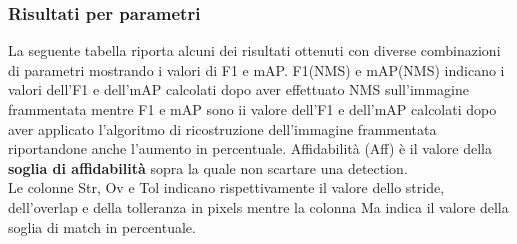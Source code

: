 \clearpage
\subsubsection{Risultati per parametri}
La seguente tabella riporta alcuni dei risultati ottenuti con diverse combinazioni di parametri mostrando i valori di F1 e mAP. F1(NMS) e mAP(NMS) indicano i valori dell'F1 e dell'mAP calcolati dopo aver effettuato NMS sull'immagine frammentata mentre F1 e mAP sono ii valore dell'F1 e dell'mAP calcolati dopo aver applicato l'algoritmo di ricostruzione dell'immagine frammentata riportandone anche l'aumento in percentuale. Affidabilità (Aff) è il valore della \textbf{soglia di affidabilità} sopra la quale non scartare una detection.\\
Le colonne Str, Ov e Tol indicano rispettivamente il valore dello stride, dell'overlap e della tolleranza in pixels mentre la colonna Ma indica il valore della soglia di match in percentuale.


